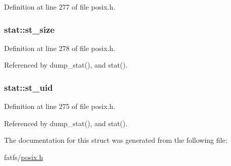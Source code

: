 Definition at line 277 of file posix.\+h.

\subsubsection[{\texorpdfstring{st\+\_\+size}{st_size}}]{ stat\+::st\+\_\+size}\hypertarget{structstat_a040e19c8b9766f841fde8786ce9297bf}{}\label{structstat_a040e19c8b9766f841fde8786ce9297bf}


Definition at line 278 of file posix.\+h.



Referenced by dump\+\_\+stat(), and stat().

\subsubsection[{\texorpdfstring{st\+\_\+uid}{st_uid}}]{ stat\+::st\+\_\+uid}\hypertarget{structstat_a4a8708a3d18be60ee7b2f06c4cab0c70}{}\label{structstat_a4a8708a3d18be60ee7b2f06c4cab0c70}


Definition at line 275 of file posix.\+h.



Referenced by dump\+\_\+stat(), and stat().



The documentation for this struct was generated from the following file\+:\begin{DoxyCompactItemize}
\item 
fatfs/\hyperlink{posix_8h}{posix.\+h}\end{DoxyCompactItemize}
